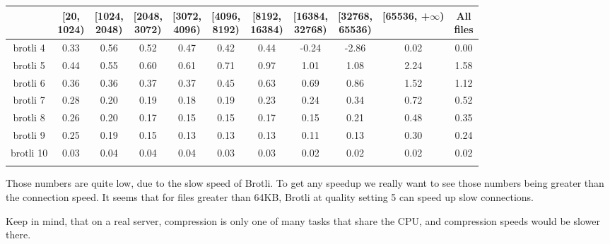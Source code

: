 \documentclass[12pt]{article}
\begin{document}
\begin{table}[H]
\centering
\begin{threeparttable}
\begin{tabular}{ccccccccccc}
  \toprule
  \thead{} & \thead{[20,\\ 1024)} & \thead{[1024,\\ 2048)} & \thead{[2048,\\ 3072)}
           & \thead{[3072,\\ 4096)} & \thead{[4096,\\ 8192)} & \thead{[8192,\\ 16384)}
           & \thead{[16384,\\ 32768)} & \thead{[32768,\\ 65536)}
           & \thead{[65536,\\ +$\infty$)} & \thead{All \\ files} \\
  \midrule
  brotli 4 & 0.33 & 0.56 & 0.52 & 0.47 & 0.42 & 0.44 & -0.24 & -2.86 & 0.02 & 0.00 \\
  brotli 5 & 0.44 & 0.55 & 0.60 & 0.61 & 0.71 & 0.97 & 1.01 & 1.08 & 2.24 & 1.58 \\
  brotli 6 & 0.36 & 0.36 & 0.37 & 0.37 & 0.45 & 0.63 & 0.69 & 0.86 & 1.52 & 1.12 \\
  brotli 7 & 0.28 & 0.20 & 0.19 & 0.18 & 0.19 & 0.23 & 0.24 & 0.34 & 0.72 & 0.52 \\
  brotli 8 & 0.26 & 0.20 & 0.17 & 0.15 & 0.15 & 0.17 & 0.15 & 0.21 & 0.48 & 0.35 \\
  brotli 9 & 0.25 & 0.19 & 0.15 & 0.13 & 0.13 & 0.13 & 0.11 & 0.13 & 0.30 & 0.24 \\
  brotli 10 & 0.03 & 0.04 & 0.04 & 0.04 & 0.03 & 0.03 & 0.02 & 0.02 & 0.02 & 0.02 \\
  \bottomrule\addlinespace[1ex]
\end{tabular}
\end{threeparttable}
\end{table}


Those numbers are quite low, due to the slow speed of Brotli. To get any
speedup we really want to see those numbers being greater than the
connection speed. It seems that for files greater than 64KB, Brotli at
quality setting 5 can speed up slow connections.

Keep in mind, that on a real server, compression is only one of many
tasks that share the CPU, and compression speeds would be slower there.
\end{document}
